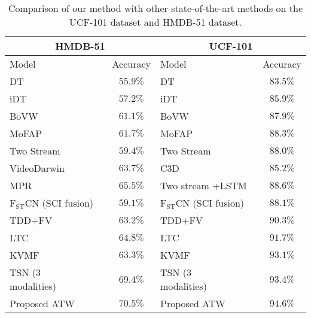 \documentclass[runningheads,a4paper]{llncs}
\begin{document}
\begin{table*}[t]
 \caption{Comparison of our method with other state-of-the-art methods on the UCF-101 dataset and HMDB-51 dataset.}
 \label{tbl:stoa}
 \begin{center}
	 \begin{small}
	 \begin{tabular}{lc|lc}
	 \toprule
	 \multicolumn{2}{c|}{HMDB-51} & \multicolumn{2}{c}{UCF-101} \\
	 \midrule
	 \multicolumn{1}{l}{Model} & \multicolumn{1}{c|}{Accuracy} &
	 \multicolumn{1}{l}{Model} & \multicolumn{1}{c}{Accuracy} \\
		 \midrule
	 DT \cite{cai2014multi} & $ 55.9\% $ & DT \cite{cai2014multi} & $ 83.5\% $ \\
 	iDT \cite{wang2013action} & $ 57.2\% $ & iDT \cite{wang2013action} & $ 85.9\% $ \\
 	BoVW \cite{peng2016bag} & $ 61.1\% $ & BoVW \cite{peng2016bag} & $ 87.9\% $ \\
 	MoFAP \cite{wang2016mofap} & $ 61.7\% $ & MoFAP \cite{wang2016mofap} & $ 88.3\% $ \\
 	Two Stream \cite{simonyan2014two} & $ 59.4\% $ & Two Stream \cite{simonyan2014two} & $ 88.0\% $ \\
 	VideoDarwin \cite{fernando2015modeling} & $ 63.7\% $ & C3D \cite{tran2015learning} & $ 85.2\% $ \\
 	MPR \cite{ni2015motion} & $ 65.5\% $ & Two stream +LSTM \cite{yue2015beyond} & $ 88.6\% $ \\
 	$\mathrm{F_{ST}CN}$ (SCI fusion) \cite{sun2015human} & $ 59.1\% $ & $\mathrm{F_{ST}CN}$ (SCI fusion)
 	~\cite{sun2015human} & $ 88.1\% $ \\
 	TDD+FV \cite{wang2015action} & $ 63.2\% $ & TDD+FV \cite{wang2015action} & $ 90.3\% $ \\
 	LTC~\cite{varol2017long} & $ 64.8\% $ & LTC~\cite{varol2017long} & $ 91.7\% $ \\
 	KVMF~\cite{zhu2016key} & $ 63.3\% $ & KVMF~\cite{zhu2016key} & $ 93.1\% $ \\
 	TSN (3 modalities)~\cite{wang2016temporal}~~~~~~~~ & $ 69.4\% $ &
 	TSN (3 modalities)~\cite{wang2016temporal}~~~~~~~~ & $ 93.4\% $ \\
	\midrule
 	Proposed ATW & $ \mathbf{70.5}\% $ & Proposed ATW & $ \mathbf{94.6}\% $  \\
	 \bottomrule
   \end{tabular}
	 \end{small}
 \end{center}
\end{table*}
%
\end{document}

